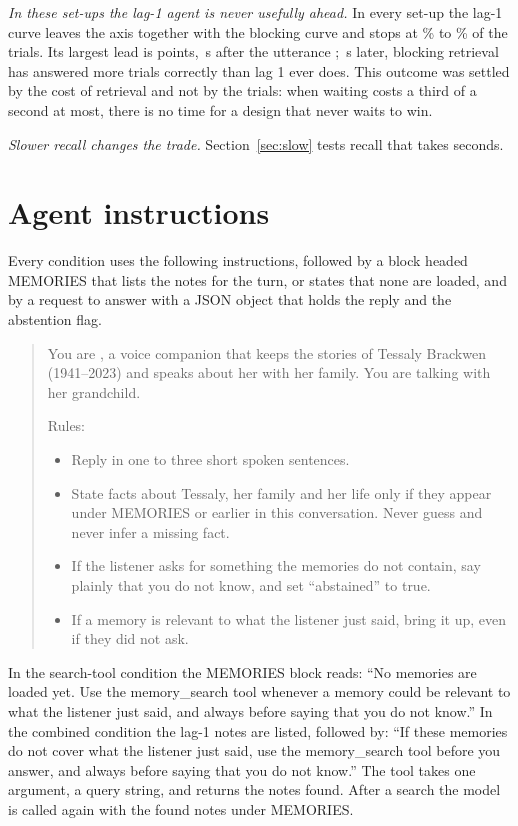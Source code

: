 \documentclass[10pt]{article}
\begin{document}
\emph{In these set-ups the lag-1 agent is never usefully ahead.} In every set-up the lag-1 curve leaves the axis together with the blocking curve and stops at \LagCeilMin\% to \LagCeilMax\% of the trials. Its largest lead is \OnTimeLeadMax{} points, \OnTimeLeadMaxAt\,s after the utterance \OnTimeLeadMaxSetup; \OnTimeLeadMaxLost\,s later, blocking retrieval has answered more trials correctly than lag 1 ever does. This outcome was settled by the cost of retrieval and not by the trials: when waiting costs a third of a second at most, there is no time for a design that never waits to win.

\emph{Slower recall changes the trade.} Section~\ref{sec:slow} tests recall that takes seconds.

\section{Agent instructions}
\label{app:prompt}

Every condition uses the following instructions, followed by a block headed MEMORIES that lists the notes for the turn, or states that none are loaded, and by a request to answer with a JSON object that holds the reply and the abstention flag.

\begin{quote}
\small
You are \promptname{}, a voice companion that keeps the stories of Tessaly Brackwen (1941--2023) and speaks about her with her family. You are talking with her grandchild.

Rules:
\begin{itemize}[leftmargin=*,itemsep=0pt,topsep=2pt]
\item Reply in one to three short spoken sentences.
\item State facts about Tessaly, her family and her life only if they appear under MEMORIES or earlier in this conversation. Never guess and never infer a missing fact.
\item If the listener asks for something the memories do not contain, say plainly that you do not know, and set ``abstained'' to true.
\item If a memory is relevant to what the listener just said, bring it up, even if they did not ask.
\end{itemize}
\end{quote}

In the search-tool condition the MEMORIES block reads: ``No memories are loaded yet. Use the memory\_search tool whenever a memory could be relevant to what the listener just said, and always before saying that you do not know.'' In the combined condition the lag-1 notes are listed, followed by: ``If these memories do not cover what the listener just said, use the memory\_search tool before you answer, and always before saying that you do not know.'' The tool takes one argument, a query string, and returns the notes found. After a search the model is called again with the found notes under MEMORIES.
\end{document}
